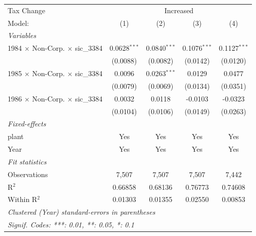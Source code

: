 \documentclass[
  12pt]{article}
\theoremstyle{definition}
\theoremstyle{remark}
\begin{document}
\begin{table}
\begin{minipage}{\linewidth}
\begin{tabular}{lcccc}
   Tax Change & \multicolumn{4}{c}{Increased} \\ 
   Model:                                        & (1)            & (2)            & (3)            & (4)\\  
   \midrule
   \emph{Variables}\\
   1984 $\times$ Non-Corp. $\times$ sic\_3384    & 0.0628$^{***}$ & 0.0840$^{***}$ & 0.1076$^{***}$ & 0.1127$^{***}$\\   
                                                 & (0.0088)       & (0.0082)       & (0.0142)       & (0.0120)\\   
   1985 $\times$ Non-Corp. $\times$ sic\_3384    & 0.0096         & 0.0263$^{***}$ & 0.0129         & 0.0477\\   
                                                 & (0.0079)       & (0.0069)       & (0.0134)       & (0.0351)\\   
   1986 $\times$ Non-Corp. $\times$ sic\_3384    & 0.0032         & 0.0118         & -0.0103        & -0.0323\\   
                                                 & (0.0104)       & (0.0106)       & (0.0149)       & (0.0263)\\   
   \midrule
   \emph{Fixed-effects}\\
   plant                                         & Yes            & Yes            & Yes            & Yes\\  
   Year                                          & Yes            & Yes            & Yes            & Yes\\  
   \midrule
   \emph{Fit statistics}\\
   Observations                                  & 7,507          & 7,507          & 7,507          & 7,442\\  
   R$^2$                                         & 0.66858        & 0.68136        & 0.76773        & 0.74608\\  
   Within R$^2$                                  & 0.01303        & 0.01355        & 0.02550        & 0.00853\\  
   \midrule \midrule
   \multicolumn{5}{l}{\emph{Clustered (Year) standard-errors in parentheses}}\\
   \multicolumn{5}{l}{\emph{Signif. Codes: ***: 0.01, **: 0.05, *: 0.1}}\\
\end{tabular}
\par\endgroup
\begingroup
\centering
\begin{tabular}{lcccc}

\end{tabular}
\end{minipage}
\end{table}
\end{document}
